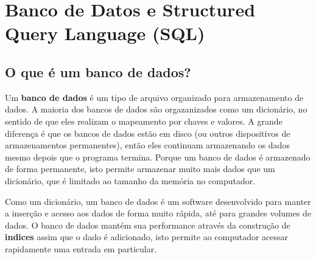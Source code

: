 
\chapter{Banco de Datos e Structured Query Language (SQL)}

\section{O que é um banco de dados?}


Um {\bf banco de dados} é um tipo de arquivo organizado para armazenamento de
dados. A maioria dos bancos de dados são orgazanizados como um dicionário, no
sentido de que eles realizam o mapeamento por chaves e valores. A grande
diferença é que os bancos de dados estão em disco (ou outros dispositivos de
armazenamentos permanentes), então eles continuam armazenando os dados mesmo
depois que o programa termina. Porque um banco de dados é armazenado de forma
permanente, isto permite armazenar muito mais dados que um dicionário, que é
limitado ao tamanho da memória no computador.


Como um dicionário, um banco de dados é um software desenvolvido para manter a
inserção e acesso aos dados de forma muito rápida, até para grandes volumes de
dados. O banco de dados mantém sua performance através da construção de
{\bf indices} assim que o dado é adicionado, isto permite ao computador acessar
rapidamente uma entrada em particular.

